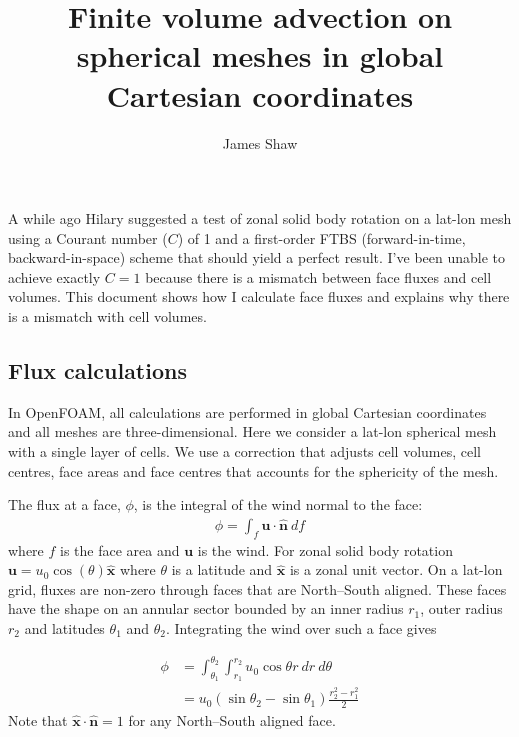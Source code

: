 \documentclass{article}
\title{Finite volume advection on spherical meshes in global Cartesian coordinates}
\author{James Shaw}
\newcommand{\Co}{C}
\newcommand{\vect}{\bm}
\begin{document}
\maketitle

A while ago Hilary suggested a test of zonal solid body rotation on a lat-lon mesh using a Courant number ($\Co$) of 1 and a first-order FTBS (forward-in-time, backward-in-space) scheme that should yield a perfect result.  I've been unable to achieve exactly $\Co = 1$ because there is a mismatch between face fluxes and cell volumes.  This document shows how I calculate face fluxes and explains why there is a mismatch with cell volumes.

\subsection*{Flux calculations}
In OpenFOAM, all calculations are performed in global Cartesian coordinates and all meshes are three-dimensional.  Here we consider a lat-lon spherical mesh with a single layer of cells.  We use a correction that adjusts cell volumes, cell centres, face areas and face centres that accounts for the sphericity of the mesh.

The flux at a face, $\phi$, is the integral of the wind normal to the face:
\begin{align}
	\phi = \int_f \vect{u} \cdot \vect{\hat{n}} \:df
\end{align}
where $f$ is the face area and $\vect{u}$ is the wind.  For zonal solid body rotation $\vect{u} = u_0 \cos(\theta) \vect{\hat{x}}$ where $\theta$ is a latitude and $\vect{\hat{x}}$ is a zonal unit vector.  On a lat-lon grid, fluxes are non-zero through faces that are North--South aligned.  These faces have the shape on an annular sector bounded by an inner radius $r_1$, outer radius $r_2$ and latitudes $\theta_1$ and $\theta_2$.  Integrating the wind over such a face gives

\begin{align}
	\phi &= \int_{\theta_1}^{\theta_2} \int_{r_1}^{r_2} u_0 \cos \theta r \:dr \:d\theta \\
	&= u_0 \left( \sin \theta_2 - \sin \theta_1 \right) \frac{r_2^2 - r_1^2}{2}
\end{align}
Note that $\vect{\hat{x}} \cdot \vect{\hat{n}} = 1$ for any North--South aligned face.
\end{document}

